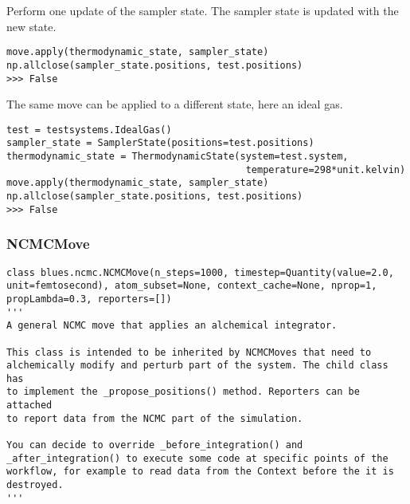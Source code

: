 \begin{description}
Perform one update of the sampler state. The sampler state is updated
with the new state.

\begin{verbatim}
move.apply(thermodynamic_state, sampler_state)
np.allclose(sampler_state.positions, test.positions)
>>> False
\end{verbatim}

The same move can be applied to a different state, here an ideal gas.

\begin{verbatim}
test = testsystems.IdealGas()
sampler_state = SamplerState(positions=test.positions)
thermodynamic_state = ThermodynamicState(system=test.system,
                                          temperature=298*unit.kelvin)
move.apply(thermodynamic_state, sampler_state)
np.allclose(sampler_state.positions, test.positions)
>>> False
\end{verbatim}
\end{description}

\hypertarget{ncmcmove}{%
\subsubsection{NCMCMove}\label{ncmcmove}}

\begin{verbatim}
class blues.ncmc.NCMCMove(n_steps=1000, timestep=Quantity(value=2.0, unit=femtosecond), atom_subset=None, context_cache=None, nprop=1, propLambda=0.3, reporters=[])
'''
A general NCMC move that applies an alchemical integrator.

This class is intended to be inherited by NCMCMoves that need to
alchemically modify and perturb part of the system. The child class has
to implement the _propose_positions() method. Reporters can be attached
to report data from the NCMC part of the simulation.

You can decide to override _before_integration() and
_after_integration() to execute some code at specific points of the
workflow, for example to read data from the Context before the it is
destroyed.
'''
\end{verbatim}


